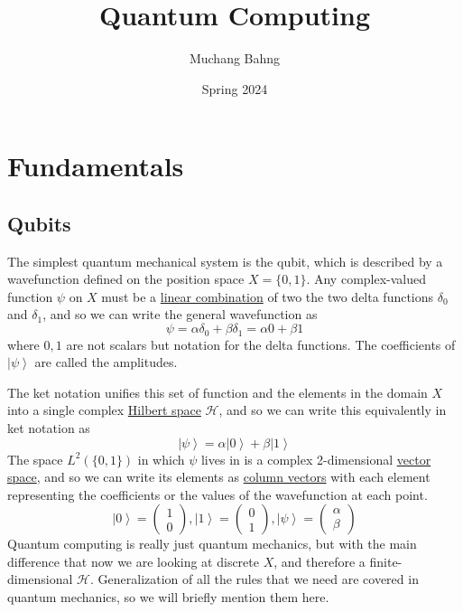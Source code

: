 \documentclass{article}
\newcommand{\ket}[1]{\ensuremath{\left|#1\right\rangle}}
\newcounter{definition}[section]
\begin{document}
\title{Quantum Computing}
\author{Muchang Bahng}
\date{Spring 2024}

\maketitle
\tableofcontents
\pagebreak 

\section{Fundamentals}
  
  \subsection{Qubits}

    \begin{definition}[Qubit]
      \label{def:qubit}
      The simplest quantum mechanical system is the qubit, which is described by a wavefunction defined on the position space $X = \{0, 1\}$. Any complex-valued function $\psi$ on $X$ must be a \hyperref[lin-def:linear-combination]{linear combination} of two the two delta functions $\delta_0$ and $\delta_1$, and so we can write the general wavefunction as \begin{equation} 
        \psi = \alpha \delta_0 + \beta \delta_1 = \alpha 0 + \beta 1
      \end{equation} 
      where $0, 1$ are not scalars but notation for the delta functions. The coefficients of $\ket{\psi}$ are called the amplitudes. 
    \end{definition}

    The ket notation unifies this set of function and the elements in the domain $X$ into a single complex \hyperref[fa-def:hilbert-space]{Hilbert space} $\mathcal{H}$, and so we can write this equivalently in ket notation as 
    \begin{equation} 
      \ket{\psi} = \alpha \ket{0} + \beta \ket{1} 
    \end{equation}
    The space $L^2(\{0, 1\})$ in which $\psi$ lives in is a complex 2-dimensional \hyperref[lin-def:vector-space]{vector space}, and so we can write its elements as \hyperref[lin-def:column-vector]{column vectors} with each element representing the coefficients or the values of the wavefunction at each point. 
    \begin{equation} 
      \ket{0} = \begin{pmatrix} 1 \\ 0 \end{pmatrix}, \ket{1} = \begin{pmatrix} 0 \\ 1 \end{pmatrix}, \ket{\psi} = \begin{pmatrix} \alpha \\ \beta \end{pmatrix}
    \end{equation}
    Quantum computing is really just quantum mechanics, but with the main difference that now we are looking at discrete $X$, and therefore a finite-dimensional $\mathcal{H}$. Generalization of all the rules that we need are covered in quantum mechanics, so we will briefly mention them here. 
\end{document}
